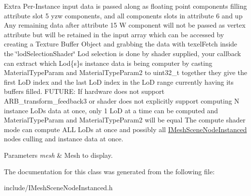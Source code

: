 Extra Per-\/\+Instance input data is passed along as floating point components filling attribute slot 5 yzw components, and all components slots in attribute 6 and up Any remaining data after attribute 15 W component will not be passed as vertex attribute but will be retained in the input array which can be accessed by creating a Texture Buffer Object and grabbing the data with texel\+Fetch inside the \char`\"{}lod\+Selection\+Shader\char`\"{} Lod selection is done by shader supplied, your callback can extract which Lod\{s\}\textquotesingle{}s instance data is being computer by casting Material\+Type\+Param and Material\+Type\+Param2 to uint32\+\_\+t together they give the first LoD index and the last LoD index in the LoD range currently having its buffers filled. F\+U\+T\+U\+RE\+: If hardware does not support A\+R\+B\+\_\+transform\+\_\+feedback3 or shader does not explicitly support computing N instance LoD\textquotesingle{}s data at once, only 1 LoD at a time can be computed and Material\+Type\+Param and Material\+Type\+Param2 will be equal The compute shader mode can compute A\+LL Lo\+Ds at once and possibly all \hyperlink{classirr_1_1scene_1_1IMeshSceneNodeInstanced}{I\+Mesh\+Scene\+Node\+Instanced}\textquotesingle{} nodes\textquotesingle{} culling and instance data at once. 
\begin{DoxyParams}{Parameters}
{\em mesh} & Mesh to display. \\
\hline
\end{DoxyParams}


The documentation for this class was generated from the following file\+:\begin{DoxyCompactItemize}
\item 
include/I\+Mesh\+Scene\+Node\+Instanced.\+h\end{DoxyCompactItemize}
